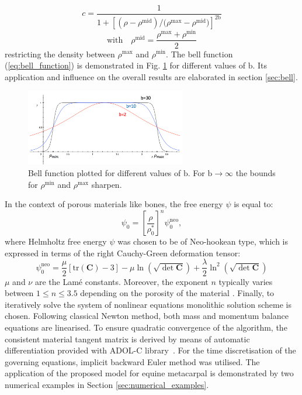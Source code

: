 \documentclass[11pt]{ACMEarticle}
\numberwithin{equation}{section}
\begin{document}
\begin{equation*}
c=\frac{1}{1 + \left[  (\rho - \rho^{\mathrm{mid}}) / (\rho{^\mathrm{max}} - \rho{^\mathrm{mid})} \right]^{2\mathrm b}}
\end{equation*}
\begin{equation}
\mathrm{with} \quad \rho^{\mathrm{mid}} = \frac{\rho{^\mathrm{max}} + \rho{^\mathrm{min}}}{2}
\label{eq:bell_function}
\end{equation}
restricting the density between $ \rho{^\mathrm{max}}$ and $ \rho{^\mathrm{min}}$. The bell function (\ref{eq:bell_function}) is demonstrated in Fig. \ref{fig:bell_func} for different values of $\mathrm{b}$. Its application and influence on the overall results are elaborated in section \ref{sec:bell}.
\begin{figure}[h!]
	\begin{centering}
		\includegraphics[width=7cm]{Figures/graphs/bell_func}
		\caption{Bell function plotted for different values of $\mathrm b$. For $\mathrm b \rightarrow \infty$ the bounds for $ \rho{^\mathrm{min}}$ and $ \rho{^\mathrm{max}}$ sharpen.}
		\label{fig:bell_func}
	\end{centering}
\end{figure}
In the context of porous materials like bones, the free energy $\psi$ is equal to:
\begin{equation}
\psi_{0}=\left[\frac{\rho}{\rho_{0}^{\ast}}\right]^{n}\psi_{0}^{\mathrm{neo}},
\label{eq:free_energ}
\end{equation}
where Helmholtz free energy $\psi$ was chosen to be of Neo-hookean type, which is expressed in terms of the right Cauchy-Green deformation tensor: 
\begin{equation}
\psi_{0}^{\mathrm{neo}}=\frac{\mu}{2}\left[\textrm{tr}(\mathbf{C})-3\right]-\mu\ln(\sqrt{\det\mathbf{C}})+\frac{\lambda}{2}\ln^{2}(\sqrt{\det\mathbf{C}})
\end{equation}
$\mu$ and $\nu$ are the Lam\'e constants. Moreover, the exponent $n$ typically varies between $1 \leq n \leq 3.5$ depending on the porosity of the material \citep{Gibson2005}.
Finally, to iteratively solve the system of nonlinear equations monolithic solution scheme is chosen. Following classical Newton method, both mass and momentum balance equations are linearised. To ensure quadratic convergence of the algorithm, the consistent material tangent matrix is derived by means of automatic differentiation provided with ADOL-C library~\citep{Walther2009}. For the time discretisation of the governing equations, implicit backward Euler method was utilised. The application of the proposed model for equine metacarpal is demonstrated by two numerical examples in Section \ref{sec:numerical_examples}.
\end{document}
